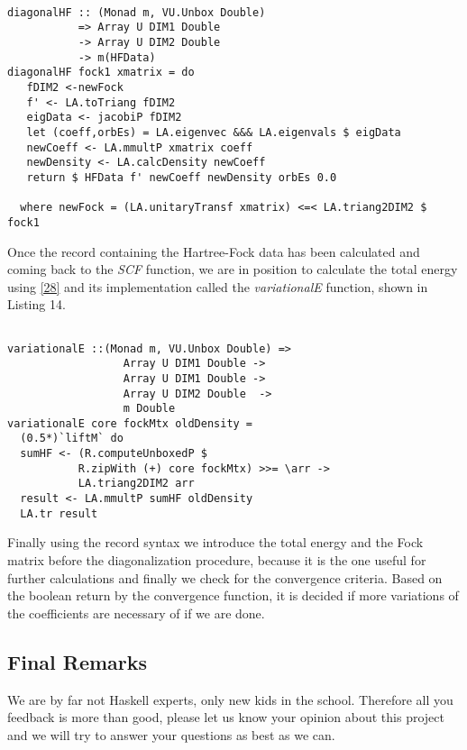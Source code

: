 \documentclass{tmr}
\begin{document}
\begin{lstlisting}[float,captionpos=b,belowcaptionskip=4pt, caption= The DiagonalHF Function]   

diagonalHF :: (Monad m, VU.Unbox Double) 
           => Array U DIM1 Double
           -> Array U DIM2 Double 
           -> m(HFData)
diagonalHF fock1 xmatrix = do
   fDIM2 <-newFock
   f' <- LA.toTriang fDIM2
   eigData <- jacobiP fDIM2
   let (coeff,orbEs) = LA.eigenvec &&& LA.eigenvals $ eigData
   newCoeff <- LA.mmultP xmatrix coeff
   newDensity <- LA.calcDensity newCoeff
   return $ HFData f' newCoeff newDensity orbEs 0.0

  where newFock = (LA.unitaryTransf xmatrix) <=< LA.triang2DIM2 $ fock1

\end{lstlisting}

Once the record containing the Hartree-Fock data has been calculated and coming back
to the \textit{SCF} function, we are in position to calculate the total energy using
\eqref{28} and its implementation called the \textit{variationalE} function, shown in Listing 14.

\begin{lstlisting}[float,captionpos=b,belowcaptionskip=4pt, caption= The DiagonalHF Function]   

variationalE ::(Monad m, VU.Unbox Double) => 
                  Array U DIM1 Double -> 
                  Array U DIM1 Double -> 
                  Array U DIM2 Double  ->
                  m Double
variationalE core fockMtx oldDensity = 
  (0.5*)`liftM` do
  sumHF <- (R.computeUnboxedP $ 
           R.zipWith (+) core fockMtx) >>= \arr ->
           LA.triang2DIM2 arr
  result <- LA.mmultP sumHF oldDensity
  LA.tr result

\end{lstlisting}

Finally using the record syntax we introduce the
total energy and the Fock matrix before the diagonalization procedure,
because it is the one useful for further calculations and finally we 
check for the convergence criteria. Based
on the boolean return by the convergence function, it is decided if more
variations of the coefficients are necessary of if we are done.

\subsection{Final Remarks}

We are by far not Haskell experts, only new kids in the school. Therefore all
you feedback is more than good, please let us know your opinion about
this project and we will try to answer your questions as best as we can.
\end{document}

